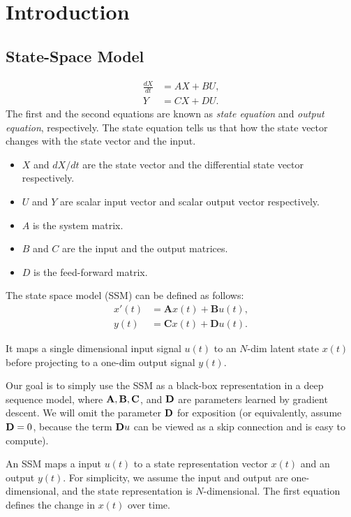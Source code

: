 \section{Introduction}
\label{state:sec:intro}


\subsection{State-Space Model}
\begin{align*}
	\frac{dX}{dt} &= {A}X+{B}U,\\
	Y &= {C}X+DU.
\end{align*}
The first and the second equations are known as \textit{state equation} and \textit{output equation}, respectively. The state equation tells us that how the state vector changes with the state vector and the input. 

\begin{itemize}
	\item $X$ and ${dX}/{dt}$ are the state vector and the differential state vector respectively. 
	\item $U$ and $Y$ are scalar input vector and scalar output vector respectively. 
	\item $A$ is the system matrix.
	\item $B$ and $C$ are the input and the output matrices.
	\item $D$ is the feed-forward matrix.
\end{itemize}


The state space model (SSM) can be defined as follows:
\begin{align*}
	x'(t) &= \mathbf{A}x(t)+\mathbf{B}u(t),\\
	y(t) &= \mathbf{C}x(t)+\mathbf{D}u(t).
\end{align*}

It maps a single dimensional input signal $u(t)$ to an $N$-dim latent state $x(t)$ before projecting to a one-dim output signal $y(t)$.  

Our goal is to simply use the SSM as a black-box representation in a deep sequence model, where ${\mathbf{A}}, {\mathbf{B}}, {\mathbf{C}}$, and ${\mathbf{D}}$ are parameters learned by gradient descent. We will omit the parameter ${\mathbf{D}}$ for exposition (or equivalently, assume ${\mathbf{D}}=0$, because the term ${\mathbf{D}} u$ can be viewed as a skip connection and is easy to compute).

An SSM maps a input $u(t)$ to a state representation vector $x(t)$ and an output $y(t)$. For simplicity, we assume the input and output are one-dimensional, and the state representation is $N$-dimensional. The first equation defines the change in $x(t)$ over time.

